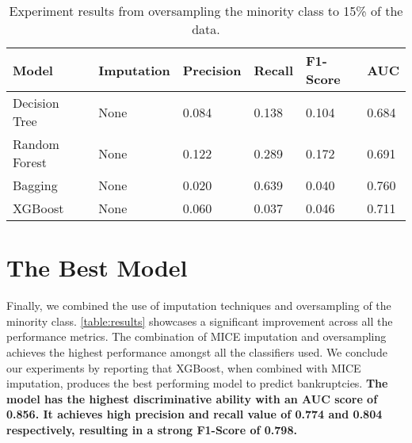 \begin{table}[htpb]
\begin{center}
 \begin{tabular}{ | p{3cm} | p{2cm} | p{1.75cm}| p{1.75cm} | p{1.75cm}| p{1.75cm} | }
 \hline
  Model & Imputation &  Precision  & Recall & F1-Score & AUC

  \\ [0.5ex] 
 \hline\hline
    
    Decision Tree & None & 0.084 & 0.138 & 0.104 & 0.684 \\ \hline
    Random Forest & None & 0.122 & 0.289 & 0.172 & 0.691 \\ \hline
    Bagging & None & 0.020 & 0.639 & 0.040 & 0.760 \\ \hline
    XGBoost & None & 0.060 & 0.037 & 0.046 & 0.711 \\ \hline
    
\end{tabular}
\end{center}

    \caption{Experiment results from oversampling the minority class to 15\% of the data.}
\label{table:noImputeyesSmote}
\end{table}

\section{The Best Model}

Finally, we combined the use of imputation techniques and oversampling of the minority class.  \autoref{table:results} showcases a significant improvement across all the performance metrics.
The combination of MICE imputation and oversampling achieves the highest performance amongst all the classifiers used.
We conclude our experiments by reporting that XGBoost, when combined with MICE imputation, produces the best performing model to predict bankruptcies. \textbf{The model has the highest discriminative ability with an AUC score of 0.856. It achieves high precision and recall value of 0.774 and 0.804 respectively, resulting in a strong F1-Score of 0.798.}

